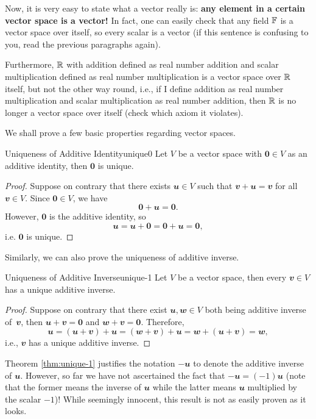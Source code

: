 \documentclass[math, code]{amznotes}
\theoremstyle{remark}
\newcommand{\zero}{\mathbf{0}}
\begin{document}
Now, it is very easy to state what a vector really is: \textbf{any element in a certain vector space is a vector!} In fact, one can easily check that any field $\mathbb{F}$ is a vector space over itself, so every scalar is a vector (if this sentence is confusing to you, read the previous paragraphs again).

Furthermore, $\mathbb{R}$ with addition defined as real number addition and scalar multiplication defined as real number multiplication is a vector space over $\mathbb{R}$ itself, but not the other way round, i.e., if I define addition as real number multiplication and scalar multiplication as real number addition, then $\mathbb{R}$ is no longer a vector space over itself (check which axiom it violates).

We shall prove a few basic properties regarding vector spaces.
\begin{thmbox}{Uniqueness of Additive Identity}{unique0}
    Let $V$ be a vector space with $\zero \in V$ as an additive identity, then $\zero$ is unique.
    \tcblower
    \begin{proof}
        Suppose on contrary that there exists $\mathbfit{u} \in V$ such that $\mathbfit{v + u = v}$ for all $\mathbfit{v} \in V$. Since $\zero \in V$, we have
        \begin{equation*}
            \zero + \mathbfit{u} = \zero.
        \end{equation*}
        However, $\zero$ is the additive identity, so 
        \begin{equation*}
            \mathbfit{u} = \mathbfit{u} + \zero = \zero + \mathbfit{u} = \zero,
        \end{equation*}
        i.e. $\zero$ is unique.
    \end{proof}
\end{thmbox}
Similarly, we can also prove the uniqueness of additive inverse.
\begin{thmbox}{Uniqueness of Additive Inverse}{unique-1}
    Let $V$ be a vector space, then every $\mathbfit{v} \in V$ has a unique additive inverse.
    \tcblower
    \begin{proof}
        Suppose on contrary that there exist $\mathbfit{u, w} \in V$ both being additive inverse of~$\mathbfit{v}$, then $\mathbfit{u + v} = \zero$ and $\mathbfit{w + v} = \zero$. Therefore,
        \begin{equation*}
            \mathbfit{u} = \mathbfit{(u + v) + u} = \mathbfit{(w + v) + u} = \mathbfit{w + (u + v)} = \mathbfit{w},
        \end{equation*}
        i.e., $\mathbfit{v}$ has a unique additive inverse.
    \end{proof}
\end{thmbox}
Theorem \ref{thm:unique-1} justifies the notation $-\mathbfit{u}$ to denote the additive inverse of $\mathbfit{u}$. However, so far we have not ascertained the fact that $-\mathbfit{u} = (-1)\mathbfit{u}$ (note that the former means the inverse of $\mathbfit{u}$ while the latter means $\mathbfit{u}$ multiplied by the scalar $-1$)! While seemingly innocent, this result is not as easily proven as it looks.
\end{document}
